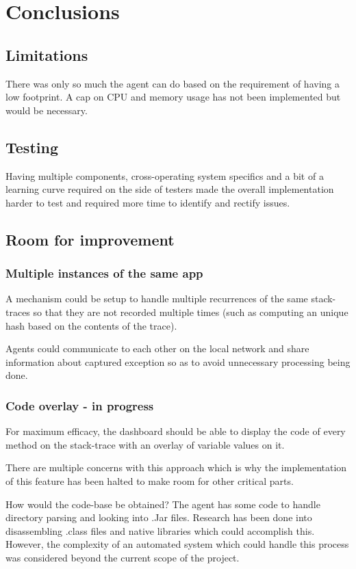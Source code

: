 \section{Conclusions}
\subsection{Limitations}
There was only so much the agent can do based on the requirement of having a low footprint. A cap on CPU and memory usage has not been implemented but would be necessary. 

\subsection{Testing}
Having multiple components, cross-operating system specifics and a bit of a learning curve required on the side of testers made the overall implementation harder to test and required more time to identify and rectify issues.

\subsection{Room for improvement}

\subsubsection{Multiple instances of the same app}
A mechanism could be setup to handle multiple recurrences of the same stack-traces so that they are not recorded multiple times (such as computing an unique hash based on the contents of the trace).

Agents could communicate to each other on the local network and share information about captured exception so as to avoid unnecessary processing being done.

\subsubsection{Code overlay - in progress}
For maximum efficacy, the dashboard should be able to display the code of every method on the stack-trace with an overlay of variable values on it.

There are multiple concerns with this approach which is why the implementation of this feature has been halted to make room for other critical parts.

How would the code-base be obtained? The agent has some code to handle directory parsing and looking into .Jar files. Research has been done into disassembling .class files and native libraries which could accomplish this. However, the complexity of an automated system which could handle this process was considered beyond the current scope of the project.

